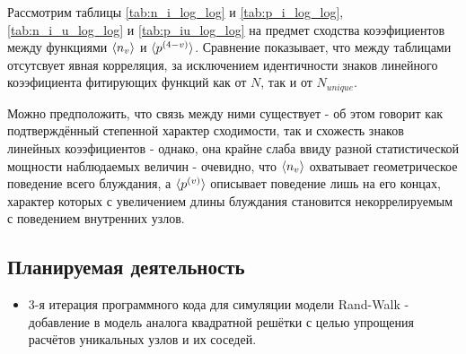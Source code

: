 Рассмотрим таблицы \ref{tab:n_i_log_log} и \ref{tab:p_i_log_log}, \ref{tab:n_i_u_log_log} и \ref{tab:p_iu_log_log} на предмет сходства коээфициентов между функциями $\langle n_v \rangle$ и $\langle p^{(4-v)} \rangle$.
Сравнение показывает, что между таблицами отсутсвует явная корреляция, за исключением идентичности знаков линейного коээфициента фитирующих функций как от $N$, так и от $N_{unique}$. 

Можно предположить, что связь между ними существует - об этом говорит как подтверждённый степенной характер сходимости, так и схожесть знаков линейных коээфициентов - однако, она крайне слаба ввиду разной статистической мощности наблюдаемых величин - очевидно, что $\langle n_v \rangle$ охватывает геометрическое поведение всего блуждания, а $\langle p^{(v)} \rangle$ описывает поведение лишь на его концах, характер которых с увеличением длины блуждания становится некоррелируемым с поведением внутренних узлов.

\subsection{Планируемая деятельность}

\begin{itemize}
\item 3-я итерация программного кода для симуляции модели Rand-Walk - добавление в модель аналога квадратной решётки с целью упрощения расчётов уникальных узлов и их соседей.
\end{itemize}
